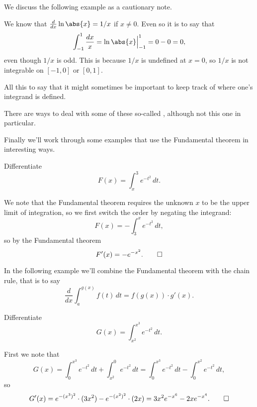 \noindent
We discuss the following example as a cautionary note.

\begin{counterexample}
	We know that $\frac{d}{d x} \ln\abs{x} = 1/x$ if $x \neq 0$. Even so it is  to say that
	\[
		\int_{-1}^1 \frac{d x}{x} = \ln\abs{x} \Big \rvert_{-1}^1 = 0 - 0 = 0,
	\]
	even though $1/x$ is odd. This is because $1/x$ is undefined at $x = 0$, so $1/x$ is not integrable on $[{-1}, 0]$ or $[0, 1]$.

	All this to say that it might sometimes be important to keep track of where one's integrand is defined.

	There are ways to deal with some of these so-called , although not this one in particular.
\end{counterexample}

\noindent
Finally we'll work through some examples that use the Fundamental theorem in interesting ways.

\begin{example}
	Differentiate
	\[
		F(x) = \int_x^3 e^{-t^2} \, d t.
	\]

	\noindent
	We note that the Fundamental theorem requires the unknown $x$ to be the upper limit of integration, so we first switch the order by negating the integrand:
	\[
		F(x) = - \int_3^x e^{-t^2} \, d t,
	\]
	so by the Fundamental theorem
	\[
		F'(x) = - e^{-x^2}. \qedhere
	\]
\end{example}

\noindent
In the following example we'll combine the Fundamental theorem with the chain rule, that is to say
\[
	\frac{d}{d x} \int_a^{g(x)} f(t) \, d t = f(g(x)) \cdot g'(x).
\]

\begin{example}
	Differentiate
	\[
		G(x) = \int_{x^2}^{x^3} e^{-t^2} \, d t.
	\]

	\noindent
	First we note that
	\[
		G(x) = \int_0^{x^3} e^{-t^2} \, d t + \int_{x^2}^0 e^{-t^2} \, d t = \int_0^{x^3} e^{-t^2} \, d t - \int_0^{x^2} e^{-t^2} \, d t,
	\]
	so
	\[
		G'(x) = e^{-(x^3)^2} \cdot (3 x^2) - e^{-(x^2)^2} \cdot (2 x) = 3x^2 e^{-x^6} - 2xe^{-x^4}. \qedhere
	\]
\end{example}
